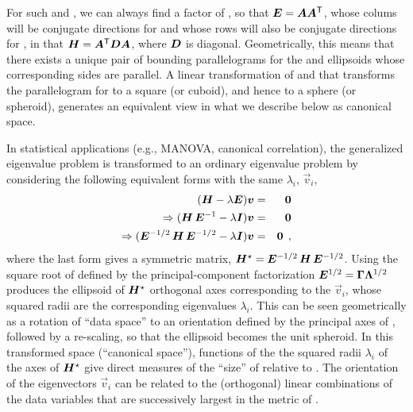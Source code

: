 For such  and , we can always find a factor  of , so that
$\bm{E} = \bm{A} \bm{A}^\mathsf{T}$, whose colums will be conjugate directions for 
and whose rows will also be conjugate directions for , in that $\bm{H} = \bm{A}^\mathsf{T} \bm{D} \bm{A}$,
where $\bm{D}$ is diagonal.  Geometrically, this means that there exists a unique pair of
bounding parallelograms for the  and  ellipsoids whose
corresponding sides are parallel. A linear transformation of  and 
that transforms the parallelogram
for  to a square (or cuboid), and hence  to a sphere (or spheroid), generates an
equivalent view in what we describe below as canonical space.


In statistical applications (e.g., MANOVA, canonical correlation), the generalized
eigenvalue problem is transformed to an ordinary eigenvalue problem by considering
the following equivalent forms with the same $\lambda_i$, $\vec{v}_i$,
\begin{eqnarray*}
(\bm{H} - \lambda \bm{E}) \bm{v} & = & \bm{0} \\
\Rightarrow (\bm{H} \, \bm{\bm{E}}^{-1} - \lambda \bm{I}) \bm{v} & = & \bm{0} \\
\Rightarrow (\bm{\bm{E}}^{-1/2} \, \bm{H} \, \bm{\bm{E}}^{-1/2} - \lambda \bm{I}) \bm{v} & = & \bm{0} \:\: ,
\end{eqnarray*}
where the last form gives a symmetric matrix, $\bm{H}^\star = \bm{E}^{-1/2} \, \bm{H} \, \bm{E}^{-1/2}$.
Using the square root of  defined by the
principal-component factorization $\bm{E}^{1/2} = \bm{\Gamma} \bm{\bm{\Lambda}}^{1/2}$ produces
the ellipsoid of $\bm{H}^\star$
orthogonal axes corresponding to the $\vec{v}_i$, whose squared radii are the corresponding %
eigenvalues $\lambda_i$.  This can be seen geometrically as a rotation of ``data space''
to an orientation defined by the principal axes of , followed by a re-scaling, so
that the  ellipsoid becomes the unit spheroid.  In this transformed space
(``canonical space''), functions of the
the squared radii $\lambda_i$ of the axes of $\bm{H}^\star$ give direct measures of %
the ``size'' of  relative to . The orientation of the eigenvectors
$\vec{v}_i$ can be related to the (orthogonal) linear combinations of the
data variables that are successively largest in the metric of .


